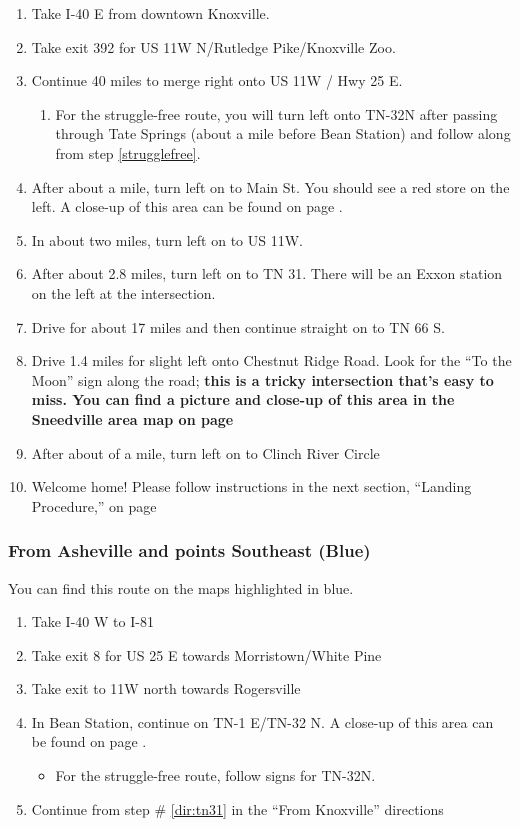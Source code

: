 \begin{enumerate}[noitemsep]
	\item Take I-40 E from downtown Knoxville.
    \item Take exit 392 for US 11W N/Rutledge Pike/Knoxville Zoo.
    \item Continue 40 miles to merge right onto US 11W / Hwy 25 E. \label{us11w}
    \begin{enumerate}
        \item For the struggle-free route, you will turn left onto TN-32N after passing through Tate Springs (about a mile before Bean Station) and follow along from step \ref{strugglefree}.
    \end{enumerate}
    \item After about a mile, turn left on to Main St.  You should see a red store on the left. A close-up of this area can be found on page \pageref{image:beanstation}.
    \item In about two miles, turn left on to US 11W.
    \item After about 2.8 miles, turn left on to TN 31.  There will be an Exxon station on the left at the intersection. \label{dir:tn31}
    \item Drive for about 17 miles and then continue straight on to TN 66 S.
    \item Drive 1.4 miles for slight left onto Chestnut Ridge Road.  Look for the ``To the Moon'' sign along the road; \textbf{this is a tricky intersection that's easy to miss. \label{dir:chestnutridge} You can find a picture and close-up of this area in the Sneedville area map on page \pageref{image:sneedville}}
    \item After about  of a mile, turn left on to Clinch River Circle
    \item Welcome home!  Please follow instructions in the next section, ``Landing Procedure,'' on page \pageref{sec:parking}
\end{enumerate}


\subsubsection*{From Asheville and points Southeast (Blue)}
You can find this route on the maps highlighted in blue.

\begin{enumerate}[noitemsep]
	\item Take I-40 W to I-81
    \item Take exit 8 for US 25 E towards Morristown/White Pine
    \item Take exit to 11W north towards Rogersville
    \item In Bean Station, continue on TN-1 E/TN-32 N. A close-up of this area can be found on page \pageref{image:beanstation}.
    \begin{itemize}
        \item For the struggle-free route, follow signs for TN-32N.
    \end{itemize}
    \item Continue from step \# \ref{dir:tn31} in the ``From Knoxville'' directions
\end{enumerate}



